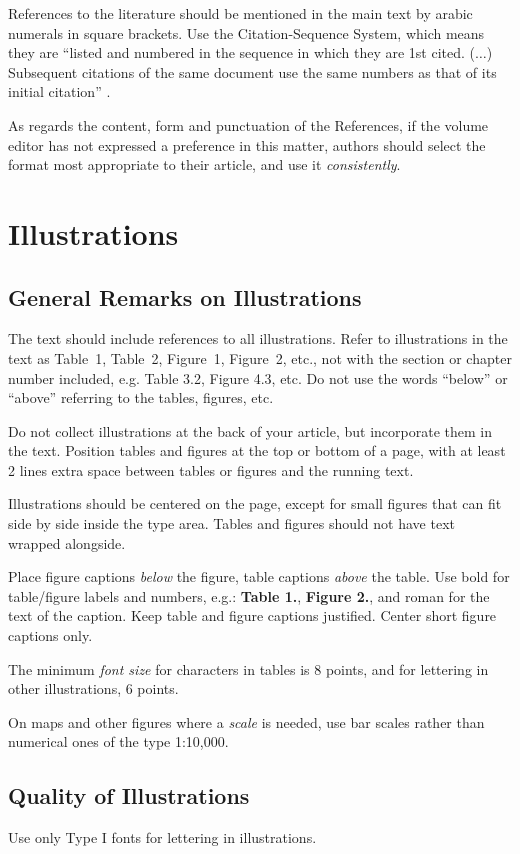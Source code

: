 \documentclass{Bigpool}
\begin{document}
References to the literature should be mentioned in the main text by arabic numerals in
square brackets. Use the Citation-Sequence System, which means they are ``listed and
numbered in the sequence in which they are 1st cited. ($\ldots$) Subsequent citations of the
same document use the same numbers as that of its initial citation'' \cite{r1}.

As regards the content, form and punctuation of the References, if the volume
editor has not expressed a preference in this matter, authors should select the format
most appropriate to their article, and use it \textit{consistently}.

\section{Illustrations}

\subsection{General Remarks on Illustrations}
The text should include references to all illustrations. Refer to illustrations in the
text as Table~1, Table~2, Figure~1, Figure~2, etc., not with the section or chapter number
included, e.g. Table 3.2, Figure 4.3, etc. Do not use the words ``below'' or ``above''
referring to the tables, figures, etc.

Do not collect illustrations at the back of your article, but incorporate them in the
text. Position tables and figures at the top or bottom of a page, with at least 2 lines
extra space between tables or figures and the running text.

Illustrations should be centered on the page, except for small figures that can fit
side by side inside the type area. Tables and figures should not have text wrapped
alongside.

Place figure captions \textit{below} the figure, table captions \textit{above} the table.
Use bold for table/figure labels and numbers, e.g.: \textbf{Table 1.}, \textbf{Figure 2.},
and roman for the text of the caption. Keep table and figure captions justified. Center
short figure captions only.

The minimum \textit{font size} for characters in tables is 8 points, and for lettering in other
illustrations, 6 points.

On maps and other figures where a \textit{scale} is needed, use bar scales rather than
numerical ones of the type 1:10,000.

\subsection{Quality of Illustrations}
Use only Type I fonts for lettering in illustrations.
\end{document}
